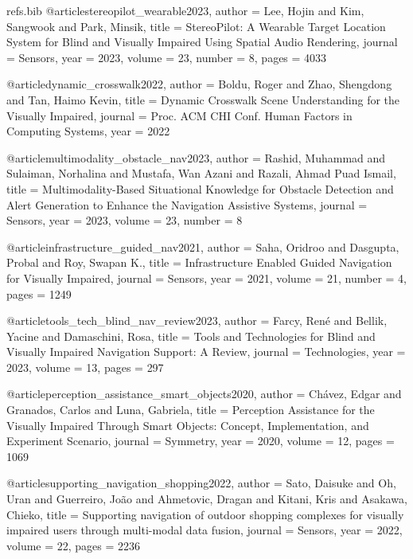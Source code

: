 \begin{filecontents*}{refs.bib}
@article{stereopilot_wearable2023,
  author    = {Lee, Hojin and Kim, Sangwook and Park, Minsik},
  title     = {{StereoPilot}: A Wearable Target Location System for Blind and Visually Impaired Using Spatial Audio Rendering},
  journal   = {Sensors},
  year      = {2023},
  volume    = {23},
  number    = {8},
  pages     = {4033}
}

@article{dynamic_crosswalk2022,
  author    = {Boldu, Roger and Zhao, Shengdong and Tan, Haimo Kevin},
  title     = {Dynamic Crosswalk Scene Understanding for the Visually Impaired},
  journal   = {Proc. ACM CHI Conf. Human Factors in Computing Systems},
  year      = {2022}
}

@article{multimodality_obstacle_nav2023,
  author    = {Rashid, Muhammad and Sulaiman, Norhalina and Mustafa, Wan Azani and Razali, Ahmad Puad Ismail},
  title     = {Multimodality-Based Situational Knowledge for Obstacle Detection and Alert Generation to Enhance the Navigation Assistive Systems},
  journal   = {Sensors},
  year      = {2023},
  volume    = {23},
  number    = {8}
}

@article{infrastructure_guided_nav2021,
  author    = {Saha, Oridroo and Dasgupta, Probal and Roy, Swapan K.},
  title     = {Infrastructure Enabled Guided Navigation for Visually Impaired},
  journal   = {Sensors},
  year      = {2021},
  volume    = {21},
  number    = {4},
  pages     = {1249}
}

@article{tools_tech_blind_nav_review2023,
  author    = {Farcy, Ren{\'e} and Bellik, Yacine and Damaschini, Rosa},
  title     = {Tools and Technologies for Blind and Visually Impaired Navigation Support: A Review},
  journal   = {Technologies},
  year      = {2023},
  volume    = {13},
  pages     = {297}
}

@article{perception_assistance_smart_objects2020,
  author    = {Ch{\'a}vez, Edgar and Granados, Carlos and Luna, Gabriela},
  title     = {Perception Assistance for the Visually Impaired Through Smart Objects: Concept, Implementation, and Experiment Scenario},
  journal   = {Symmetry},
  year      = {2020},
  volume    = {12},
  pages     = {1069}
}

@article{supporting_navigation_shopping2022,
  author    = {Sato, Daisuke and Oh, Uran and Guerreiro, Jo{\~a}o and Ahmetovic, Dragan and Kitani, Kris and Asakawa, Chieko},
  title     = {Supporting navigation of outdoor shopping complexes for visually impaired users through multi-modal data fusion},
  journal   = {Sensors},
  year      = {2022},
  volume    = {22},
  pages     = {2236}
}


\end{filecontents*}
